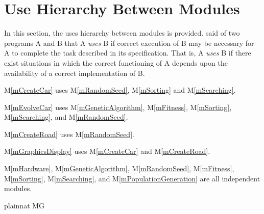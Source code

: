 \documentclass[12pt, titlepage]{article}
\newcommand{\mref}[1]{M\ref{#1}}
\begin{document}
\section{Use Hierarchy Between Modules} \label{SecUse}

In this section, the uses hierarchy between modules is
provided. \citet{Parnas1978} said of two programs A and B that A {\em uses} B if
correct execution of B may be necessary for A to complete the task described in
its specification. That is, A {\em uses} B if there exist situations in which
the correct functioning of A depends upon the availability of a correct
implementation of B.  

\mref{mCreateCar} uses \mref{mRandomSeed}, \mref{mSorting} and  
\mref{mSearching}.

\mref{mEvolveCar} uses \mref{mGeneticAlgorithm}, \mref{mFitness}, 
\mref{mSorting}, \mref{mSearching}, and \mref{mRandomSeed}.

\mref{mCreateRoad} uses \mref{mRandomSeed}.

\mref{mGraphicsDisplay} uses \mref{mCreateCar} and \mref{mCreateRoad}.

\mref{mHardware}, \mref{mGeneticAlgorithm}, \mref{mRandomSeed}, \mref{mFitness}, 
\mref{mSorting},  \mref{mSearching}, and \mref{mPopulationGeneration} are all 
independent modules.

 {plainnat}
 {MG}
\end{document}
